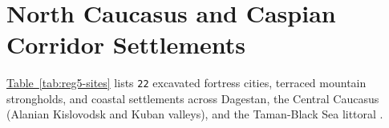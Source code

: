 \documentclass[10pt,onecolumn]{intellte}
\providecommand{\crdxref}[2]{\hyperref[#2]{#1~\ref*{#2}}}
\begin{document}
\begin{longtable}[l]
\caption{Open Pontic-Caspian Steppe Settlements and Population Estimates (250AD - 1900AD).}\label{tab:reg4-sites}\\
\end{longtable}\endgroup
\vspace{4pt}\par

\section{North Caucasus and Caspian Corridor
Settlements}\label{north-caucasus-and-caspian-corridor-settlements}

\crdxref{Table}{tab:reg5-sites} lists \texttt{22} excavated fortress
cities, terraced mountain strongholds, and coastal settlements across
Dagestan, the Central Caucasus (Alanian Kislovodsk and Kuban valleys),
and the Taman-Black Sea littoral
.
\end{document}
